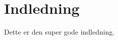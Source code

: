 \chapter{Indledning}\label{ch:Indledning}
Dette er den super gode indledning.\cite{website:Eksempel}